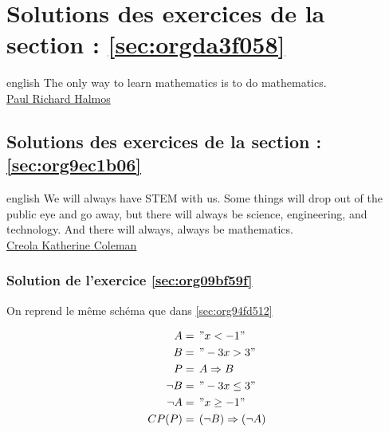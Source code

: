 \documentclass[a4paper, 11pt, twoside]{article}
\begin{document}
\section{Solutions des exercices de la section : \ref{sec:orgda3f058}}
\label{sec:orgb193882}

\begin{foreigndisplayquote}{english}
The only way to learn mathematics is to do mathematics.\\

\href{https://en.wikipedia.org/wiki/Paul\_Halmos}{Paul Richard Halmos}
\end{foreigndisplayquote}

\startcontents[level-1]

\subsection{Solutions des exercices de la section : \ref{sec:org9ec1b06}}
\label{sec:orgf5fe291}

\begin{foreigndisplayquote}{english}
We will always have STEM with us. Some things will drop out of the
public eye and go away, but there will always be science,
engineering, and technology. And there will always, always be
mathematics.\\

\href{https://en.wikipedia.org/wiki/Katherine\_Johnson}{Creola Katherine Coleman}
\end{foreigndisplayquote}

\startcontents[level-2]


\subsubsection{Solution de l'exercice \ref{sec:org09bf59f}}
\label{sec:org7a53d3d}
On reprend le même schéma que dans \ref{sec:org94fd512}

\begin{align*}
A &=\,"x < -1"\\
B &=\,"-3x > 3"\\
P &=\,A\Rightarrow B\\
\neg B &=\, "-3x \leq 3"\\
\neg A &=\, "x \geq -1"\\
CP(P) &=\,(\neg B)\Rightarrow(\neg A)
\end{align*}
\end{document}
